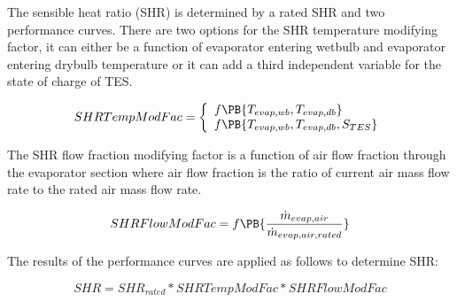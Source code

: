 The sensible heat ratio (SHR) is determined by a rated SHR and two performance curves. There are two options for the SHR temperature modifying factor, it can either be a function of evaporator entering wetbulb and evaporator entering drybulb temperature or it can add a third independent variable for the state of charge of TES.

\begin{equation}
  SHRTempModFac = \left\{
    \begin{array}{l}
      f\PB{T_{evap,wb},T_{evap,db}} \\
      f\PB{T_{evap,wb},T_{evap,db},S_{TES}}
    \end{array}
  \right.
\end{equation}

The SHR flow fraction modifying factor is a function of air flow fraction through the evaporator section where air flow fraction is the ratio of current air mass flow rate to the rated air mass flow rate.

\begin{equation}
SHRFlowModFac = f\PB{\frac{\dot{m}_{evap,air}}{\dot{m}_{evap,air,rated}}}
\end{equation}

The results of the performance curves are applied as follows to determine SHR:

\begin{equation}
SHR = SH{R_{rated}}*SHRTempModFac*SHRFlowModFac
\end{equation}
